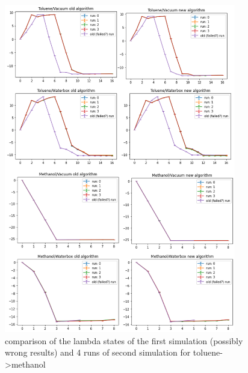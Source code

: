 \begin{figure}[htp] 


	\includegraphics[width=0.9\textwidth]{old_new_runs_states}%
	

	\caption{comparison of the lambda states of the first simulation (possibly wrong results) and 4 runs of second simulation for toluene->methanol}
\end{figure}